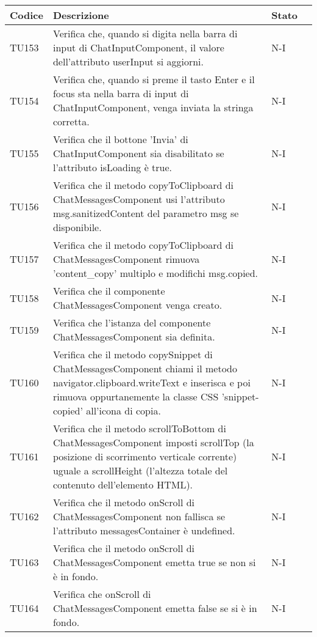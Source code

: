 \begin{table}[h!]
    \centering
    \renewcommand{\arraystretch}{1.5}
    \begin{tabularx}{\textwidth}{|p{}|X|p{}|p{}|}\hline
    \rowcolor[HTML]{FFD700}
    \textbf{Codice} & \textbf{Descrizione} & \textbf{Stato} \\ \hline

    TU153 & Verifica che, quando si digita nella barra di input di ChatInputComponent, il valore dell'attributo userInput si aggiorni. &  N-I \\ \hline
    TU154 & Verifica che, quando si preme il tasto Enter e il focus sta nella barra di input di ChatInputComponent, venga inviata la stringa corretta. &  N-I \\ \hline
    TU155 & Verifica che il bottone 'Invia' di ChatInputComponent sia disabilitato se l'attributo isLoading è true. &  N-I \\ \hline
    TU156 & Verifica che il metodo copyToClipboard di ChatMessagesComponent usi l'attributo msg.sanitizedContent del parametro msg se disponibile. &  N-I \\ \hline
    TU157 & Verifica che il metodo copyToClipboard di ChatMessagesComponent rimuova 'content\_copy' multiplo e modifichi msg.copied. &  N-I \\ \hline
    TU158 & Verifica che il componente ChatMessagesComponent venga creato. &  N-I \\ \hline
    TU159 & Verifica che l'istanza del componente ChatMessagesComponent sia definita. &  N-I \\ \hline
    TU160 & Verifica che il metodo copySnippet di ChatMessagesComponent chiami il metodo navigator.clipboard.writeText e inserisca e poi rimuova oppurtanemente la classe CSS 'snippet-copied' all'icona di copia. &  N-I \\ \hline
    TU161 & Verifica che il metodo scrollToBottom di ChatMessagesComponent imposti scrollTop (la posizione di scorrimento verticale corrente) uguale a scrollHeight (l'altezza totale del contenuto dell'elemento HTML). &  N-I \\ \hline
    TU162 & Verifica che il metodo onScroll di ChatMessagesComponent non fallisca se l'attributo messagesContainer è undefined. &  N-I \\ \hline
    TU163 & Verifica che il metodo onScroll di ChatMessagesComponent emetta true se non si è in fondo. &  N-I \\ \hline
    TU164 & Verifica che onScroll di ChatMessagesComponent emetta false se si è in fondo. &  N-I \\ \hline

\end{tabularx}
\end{table}
